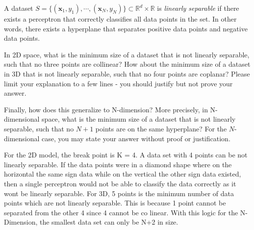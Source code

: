 \begin{problem}[4]
  A dataset $S = \{(\mathbf{x}_1, y_1),\cdots,(\mathbf{x}_N, y_N)\} \subset \mathbb{R}^d \times \mathbb{R}$ is \emph{linearly separable} if there exists a perceptron that correctly classifies all data points in the set. In other words, there exists a hyperplane that separates positive data points and negative data points.

  In 2D space, what is the minimum size of a dataset that is not linearly separable, such that no three points are collinear? How about the minimum size of a dataset in 3D that is not linearly separable, such that no four points are coplanar? Please limit your explanation to a few lines - you should justify but not prove your answer.

  Finally, how does this generalize to N-dimension? More precisely, in N-dimensional space, what is the minimum size of a dataset that is not linearly separable, such that no $N+1$ points are on the same hyperplane? For the $N$-dimensional case, you may state your answer without proof or justification.
\end{problem}
\begin{solution}
For the 2D model, the break point is K = 4. A data set with 4 points can be not linearly separable. If the data points were in a diamond shape where on the horizontal the same sign data while on the vertical the other sign data existed, then a single perceptron would not be able to classify the data correctly as it wont be linearly separable. For 3D, 5 points is the minimum number of data points which are not linearly separable. This is because 1 point cannot be separated from the other 4 since 4 cannot be co linear. With this logic for the N-Dimension, the smallest data set can only be N+2 in size. 
\end{solution}

